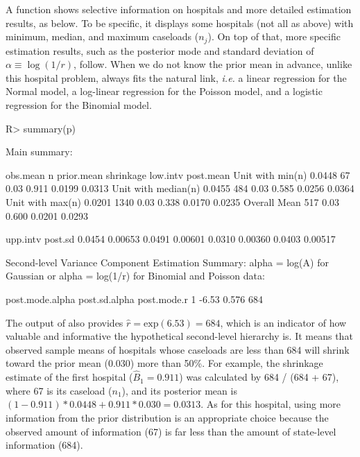\documentclass[article]{jss}
\begin{document}
A function  shows selective information on hospitals and more detailed estimation results, as below. To be specific, it displays some hospitals (not all as above) with minimum, median, and maximum caseloads ($n_{j}$). On top of that, more specific estimation results, such as the posterior mode and standard deviation of $\alpha\equiv\log(1/r)$, follow. When we do not know the prior mean in advance, unlike this hospital problem,  always fits the natural link, \emph{i.e.} a linear regression for the Normal model, a log-linear regression for the Poisson model, and a logistic regression for the Binomial model.
\begin{CodeChunk}
\begin{CodeInput}
R> summary(p)
\end{CodeInput}
\begin{CodeOutput}
Main summary:

                    obs.mean    n prior.mean shrinkage low.intv post.mean
Unit with min(n)      0.0448   67       0.03     0.911   0.0199    0.0313   
Unit with median(n)   0.0455  484       0.03     0.585   0.0256    0.0364   
Unit with max(n)      0.0201 1340       0.03     0.338   0.0170    0.0235   
Overall Mean                  517       0.03     0.600   0.0201    0.0293   

                    upp.intv  post.sd
                      0.0454  0.00653
                      0.0491  0.00601
                      0.0310  0.00360
                      0.0403  0.00517

Second-level Variance Component Estimation Summary:
alpha = log(A) for Gaussian or alpha = log(1/r) for Binomial and Poisson data:

  post.mode.alpha post.sd.alpha post.mode.r
1           -6.53         0.576         684
\end{CodeOutput}
\end{CodeChunk}
The output of  also provides $\hat{r}=\textrm{exp}(6.53)=684$, which is an indicator of how valuable and informative the hypothetical second-level hierarchy is. It means that observed sample means of hospitals whose caseloads are less than 684 will shrink toward the prior mean (0.030) more than 50\%. For example, the shrinkage estimate of the first hospital ($\hat{B}_{1}= 0.911$) was calculated by 684 / (684 + 67), where 67 is its caseload ($n_{1}$), and its posterior mean is $(1-0.911)*0.0448 + 0.911 * 0.030=0.0313$. As for this hospital, using more information from the prior distribution is an appropriate choice because the observed amount of information (67) is far less than the amount of state-level information (684).
\end{document}
